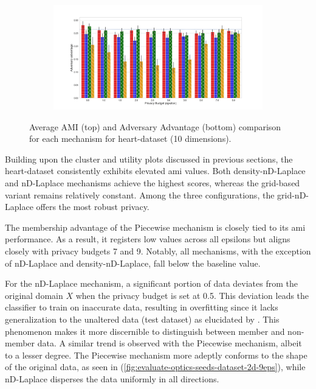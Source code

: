 \begin{figure}[H]
\begin{subfigure}{1\textwidth}
  \end{subfigure}
  \begin{subfigure}{1\textwidth}
    \includegraphics[width=1\textwidth]{Results/nd-laplace/attack_adv_heart-dataset_comparison.png}
  \end{subfigure}
  \caption{Average AMI (top) and Adversary Advantage (bottom) comparison for each mechanism for heart-dataset (10 dimensions).}
  \label{fig:utility_heart-dataset_comparison_nd_plot}
\end{figure}
Building upon the cluster and utility plots discussed in previous sections, the heart-dataset consistently exhibits elevated \gls{ami} values. Both density-nD-Laplace and nD-Laplace mechanisms achieve the highest scores, whereas the grid-based variant remains relatively constant. Among the three configurations, the grid-nD-Laplace offers the most robust privacy.

The membership advantage of the Piecewise mechanism is closely tied to its \gls{ami} performance. As a result, it registers low values across all epsilons but aligns closely with privacy budgets 7 and 9. Notably, all mechanisms, with the exception of nD-Laplace and density-nD-Laplace, fall below the baseline value.

For the nD-Laplace mechanism, a significant portion of data deviates from the original domain $X$ when the privacy budget is set at 0.5. This deviation leads the classifier to train on inaccurate data, resulting in overfitting since it lacks generalization to the unaltered data (test dataset) as elucidated by \citep{shokri_membership_2017}. This phenomenon makes it more discernible to distinguish between member and non-member data. A similar trend is observed with the Piecewise mechanism, albeit to a lesser degree. The Piecewise mechanism more adeptly conforms to the shape of the original data, as seen in (\ref{fig:evaluate-optics-seeds-dataset-2d-9eps}), while nD-Laplace disperses the data uniformly in all directions.
\newpage

